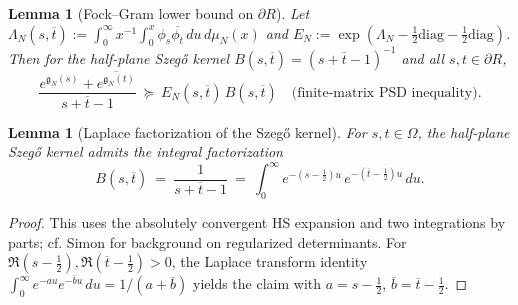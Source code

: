 \documentclass[11pt]{article}
\newtheorem{lemma}[theorem]{Lemma}
\theoremstyle{definition}
\theoremstyle{remark}
\begin{document}
\begin{lemma}[Fock–Gram lower bound on \(\partial R\)]\label{lem:fock-gram-formal}
Let \(\Lambda_N(s,\overline t):=\int_0^\infty x^{-1}\int_0^x \phi_s\overline{\phi_t}\,du\,d\mu_N(x)\) and \(E_N:=\exp(\Lambda_N-\tfrac12\mathrm{diag}-\tfrac12\mathrm{diag})\). Then for the half-plane Szeg\H{o} kernel \(B(s,\overline t)=(s+\overline t-1)^{-1}\) and all \(s,t\in\partial R\),
\[\frac{e^{\mathfrak g_N(s)}+\overline{e^{\mathfrak g_N(t)}}}{s+\overline t-1}\ \succeq\ E_N(s,\overline t)\,B(s,\overline t)\quad\text{(finite-matrix PSD inequality).}\]
\end{lemma}

\begin{lemma}[Laplace factorization of the Szeg\H{o} kernel]\label{lem:laplace-szego}
For \(s,t\in\Omega\), the half-plane Szeg\H{o} kernel admits the integral factorization
\[
 B(s,\overline t)\ =\ \frac{1}{s+\overline t-1}\ =\ \int_{0}^{\infty} e^{-(s-\tfrac12)u}\,e^{-(\overline t-\tfrac12)u}\,du.
\]
\end{lemma}
\begin{proof}
This uses the absolutely convergent HS expansion and two integrations by parts; cf. Simon \cite[§9]{SimonTraceIdeals} for background on regularized determinants.
For \(\Re(s-\tfrac12),\Re(\overline t-\tfrac12)>0\), the Laplace transform identity \(\int_0^\infty e^{-au}e^{-\overline bu}\,du=1/(a+\overline b)\) yields the claim with \(a=s-\tfrac12\), \(\overline b=\overline t-\tfrac12\).
\end{proof}
\end{document}
